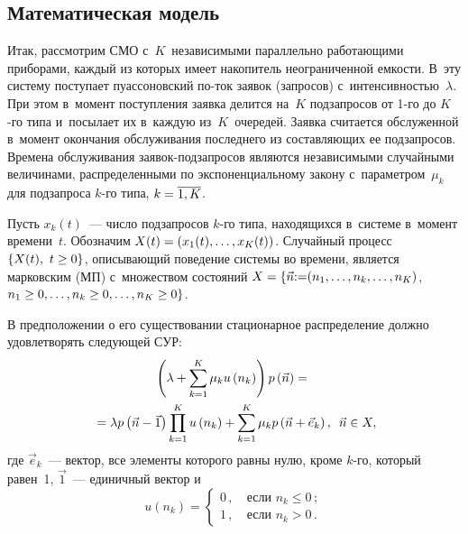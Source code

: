 \begin{multicols}{2}
\vspace*{-6pt}

\section{Математическая модель}

\vspace*{-3pt}

  Итак, рассмотрим СМО с~$K$~независимыми 
параллельно работающими приборами, каждый из которых имеет накопитель 
неограниченной ем\-кости. В~эту систему поступает пуассоновский по-\linebreak ток заявок 
(запросов) с~интенсивностью~$\lambda$. При этом в~момент поступления 
заявка делится на~$K$ подзапросов от 1-го до $K$-го типа и~посылает их\linebreak 
в~каж\-дую из~$K$~очередей. Заявка считается обслуженной в~момент окончания 
обслуживания последнего из составляющих ее подзапросов. Време\-на 
обслужива\-ния заявок-под\-за\-про\-сов являются независимыми случайными 
величинами, распределенными по экспоненциальному закону 
с~па\-ра\-мет\-ром~$\mu_k$ для подзапроса $k$-го типа, $k\hm=\overline{1,K}$.
  
  Пусть $x_k(t)$~--- число подзапросов $k$-го типа, находящихся в~системе 
в~момент времени~$t$. Обозначим $X(t)\hm= (x_1(t),\ldots, x_K(t))$. 
Случайный процесс $\{ X(t),\ t\hm\geq 0\}$, описывающий поведение системы 
во времени, является марковским (МП) с~множеством состояний $X\hm= \{ 
\vec{n}{:=}( n_1, \ldots , n_k, \ldots , n_K)$, $n_1\hm\geq 0,\ldots , n_k\hm\geq 
0,\ldots , n_K\hm\geq 0\}$.
  
  В предположении о его существовании стационарное распределение должно 
удовлетворять следующей СУР:
  \begin{multline*}
  \left( \lambda +\sum\limits_{k=1}^K \mu_k u\left( n_k\right) \right) p\left( 
\vec{n}\right) ={}\\
{}=\lambda p\left( \vec{n}-\vec{1}\right) \prod\limits_{k=1}^K u\left( 
n_k\right) +\sum\limits_{k=1}^K \mu_k p\left( \vec{n}+\vec{e}_k\right),\enskip 
\vec{n}\in X,\hspace*{-1.6638pt}
  \end{multline*}
где $\vec{e}_k$~--- вектор, все элементы которого равны нулю, кроме $k$-го, 
который равен~1, $\vec{1}$~--- единичный вектор и
$$
u\left( n_k\right) = \begin{cases}
0\,, &\ \mbox{если } n_k\leq0\,;\\
1\,, &\ \mbox{если } n_k>0\,.
\end{cases}
$$ 
  

\end{multicols}
